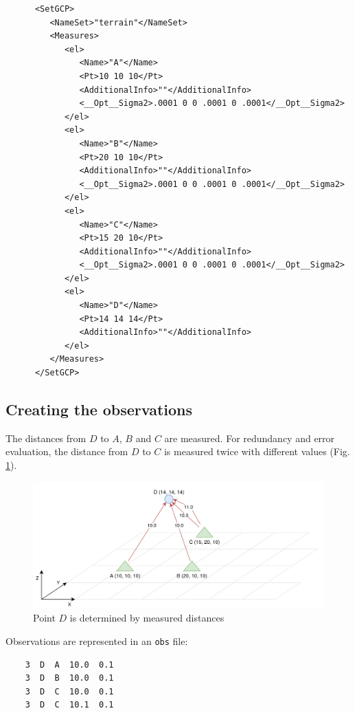 \begin{lstlisting}
      <SetGCP>
         <NameSet>"terrain"</NameSet>
         <Measures>
            <el>
               <Name>"A"</Name>
               <Pt>10 10 10</Pt>
               <AdditionalInfo>""</AdditionalInfo>
               <__Opt__Sigma2>.0001 0 0 .0001 0 .0001</__Opt__Sigma2>
            </el>
            <el>
               <Name>"B"</Name>
               <Pt>20 10 10</Pt>
               <AdditionalInfo>""</AdditionalInfo>
               <__Opt__Sigma2>.0001 0 0 .0001 0 .0001</__Opt__Sigma2>
            </el>
            <el>
               <Name>"C"</Name>
               <Pt>15 20 10</Pt>
               <AdditionalInfo>""</AdditionalInfo>
               <__Opt__Sigma2>.0001 0 0 .0001 0 .0001</__Opt__Sigma2>
            </el>
            <el>
               <Name>"D"</Name>
               <Pt>14 14 14</Pt>
               <AdditionalInfo>""</AdditionalInfo>
            </el>
         </Measures>
      </SetGCP>
\end{lstlisting}


\subsection{Creating the observations}

The distances from $D$ to $A$, $B$ and $C$ are measured. For redundancy and error evaluation, the distance from $D$ to $C$ is measured twice
with different values (Fig. \ref{fig:topoEx2}).

\begin{figure}[!h]
\centering
\includegraphics[width=12cm]{Programmer/benchtopo2.png}
\caption{Point $D$ is determined by measured distances}
\label{fig:topoEx2}
\end{figure}

Observations are represented in an {\tt obs} file:
\begin{lstlisting}
    3  D  A  10.0  0.1
    3  D  B  10.0  0.1
    3  D  C  10.0  0.1
    3  D  C  10.1  0.1
\end{lstlisting}

